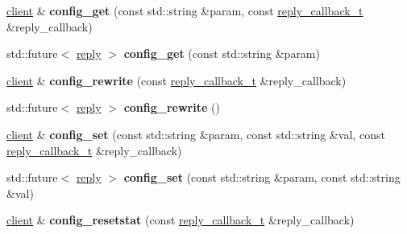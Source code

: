 \begin{DoxyCompactItemize}
\hyperlink{classcpp__redis_1_1client}{client} \& {\bfseries config\+\_\+get} (const std\+::string \&param, const \hyperlink{classcpp__redis_1_1client_a061a1140d36d2eaeda82b09a0bb3f9f2}{reply\+\_\+callback\+\_\+t} \&reply\+\_\+callback)
\item 
\mbox{\label{classcpp__redis_1_1client_a221b1e414a4b1bb4eb2a7afaac0eb39d}} 
std\+::future$<$ \hyperlink{classcpp__redis_1_1reply}{reply} $>$ {\bfseries config\+\_\+get} (const std\+::string \&param)
\item 
\mbox{\label{classcpp__redis_1_1client_a8dcf862a8a0cb75f8cc986445eae81cf}} 
\hyperlink{classcpp__redis_1_1client}{client} \& {\bfseries config\+\_\+rewrite} (const \hyperlink{classcpp__redis_1_1client_a061a1140d36d2eaeda82b09a0bb3f9f2}{reply\+\_\+callback\+\_\+t} \&reply\+\_\+callback)
\item 
\mbox{\label{classcpp__redis_1_1client_a1a001663bd555abb70521924ec2a27f8}} 
std\+::future$<$ \hyperlink{classcpp__redis_1_1reply}{reply} $>$ {\bfseries config\+\_\+rewrite} ()
\item 
\mbox{\label{classcpp__redis_1_1client_a0cff7147cd982a39cc84f91243a27364}} 
\hyperlink{classcpp__redis_1_1client}{client} \& {\bfseries config\+\_\+set} (const std\+::string \&param, const std\+::string \&val, const \hyperlink{classcpp__redis_1_1client_a061a1140d36d2eaeda82b09a0bb3f9f2}{reply\+\_\+callback\+\_\+t} \&reply\+\_\+callback)
\item 
\mbox{\label{classcpp__redis_1_1client_a8fdeb462b43ea6f5199145696713f9b1}} 
std\+::future$<$ \hyperlink{classcpp__redis_1_1reply}{reply} $>$ {\bfseries config\+\_\+set} (const std\+::string \&param, const std\+::string \&val)
\item 
\mbox{\label{classcpp__redis_1_1client_a4b1361aa6c997b76a059c144a302b5be}} 
\hyperlink{classcpp__redis_1_1client}{client} \& {\bfseries config\+\_\+resetstat} (const \hyperlink{classcpp__redis_1_1client_a061a1140d36d2eaeda82b09a0bb3f9f2}{reply\+\_\+callback\+\_\+t} \&reply\+\_\+callback)
\item 
\mbox{\label{classcpp__redis_1_1client_a775508ce5220546e46b573f95d2bcb4d}} 

\end{DoxyCompactItemize}

